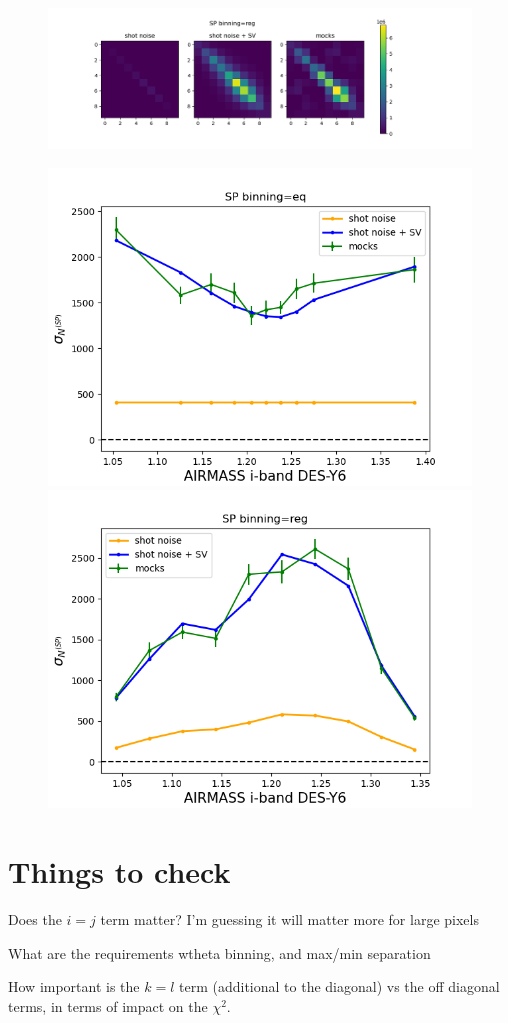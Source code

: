 \documentclass[12pt]{article}
\begin{document}
\begin{figure}[h]
    \includegraphics[width=1.2\linewidth]{../test/cov_reg.png}
    \caption{}
    \label{fig:example}
\end{figure}

\begin{figure}[h]
    \includegraphics[width=0.5\linewidth]{../test/diagonal_eq.png}
    \includegraphics[width=0.5\linewidth]{../test/diagonal_reg.png}
    \caption{}
    \label{fig:example}
\end{figure}


\section{Things to check}

Does the $i=j$ term matter? I'm guessing it will matter more for large pixels 

What are the requirements  wtheta binning, and max/min separation

How important is the $k=l$ term (additional to the diagonal) vs the off diagonal terms, in terms of impact on the $\chi^2$.
\end{document}
